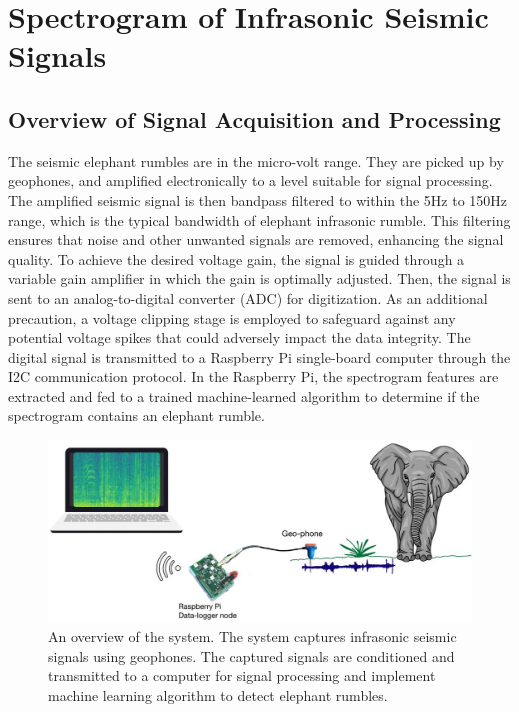 \documentclass[applsci,article,accept,moreauthors,pdftex]{Definitions/mdpi}
\begin{document}
\section{Spectrogram of Infrasonic Seismic Signals}
\subsection{Overview of Signal Acquisition and Processing}
The seismic elephant rumbles are in the micro-volt range. They are picked up by geophones, and amplified electronically to a level suitable for signal processing. The amplified seismic signal is then bandpass filtered to within the 5Hz to 150Hz range, which is the typical bandwidth of elephant infrasonic rumble. This filtering ensures that noise and other unwanted signals are removed, enhancing the signal quality. To achieve the desired voltage gain, the signal is guided through a variable gain amplifier in which the gain is optimally adjusted. Then, the signal is sent to an analog-to-digital converter (ADC) for digitization. As an additional precaution, a voltage clipping stage is employed to safeguard against any potential voltage spikes that could adversely impact the data integrity. The digital signal is transmitted to a Raspberry Pi single-board computer through the I2C communication protocol. In the Raspberry Pi, the spectrogram features are extracted and fed to a trained machine-learned algorithm to determine if the spectrogram contains an elephant rumble.
\begin{figure}
	\centering
	\includegraphics[width=0.9\columnwidth]{figures/overview.png} 
	\caption{An overview of the system. The system captures infrasonic seismic signals using geophones. The captured signals are conditioned and transmitted to a computer for signal processing and implement machine learning algorithm to detect elephant rumbles.} \label{fig:dh-prodecrrnn}
\end{figure}
\end{document}
